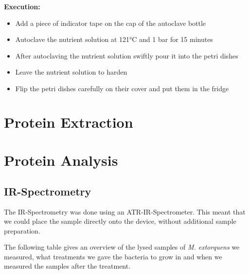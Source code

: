 \textbf{Execution:}

\begin{itemize}
    \item Add a piece of indicator tape on the cap of the autoclave bottle
    \item Autoclave the nutrient solution at 121°C and 1 bar for 15 minutes
    \item After autoclaving the nutrient solution swiftly pour it into the petri dishes
    \item Leave the nutrient solution to harden
    \item Flip the petri dishes carefully on their cover and put them in the fridge
\end{itemize}



\section{Protein Extraction\authorB}

\section{Protein Analysis\authorA}

\subsection{IR-Spectrometry}

The IR-Spectrometry was done using an ATR-IR-Spectrometer.
This meant that we could place the sample directly onto the device, without additional sample preparation.

The following table gives an overview of the lysed samples of \emph{M. extorquens} we measured, what treatments we gave the bacteria to grow in and when we measured the samples after the treatment.

